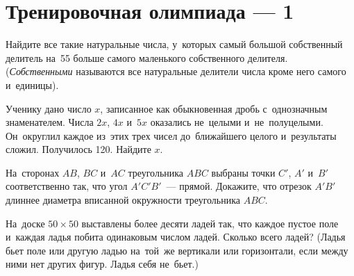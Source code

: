 
\section*{Тренировочная олимпиада --- 1}



\begin{problems}

\item
Найдите все такие натуральные числа, у~которых самый большой собственный
делитель на~55 больше самого маленького собственного делителя.
(\emph{Собственными} называются все натуральные делители числа кроме него самого
и~единицы).

\item
Ученику дано число $x$, записанное как обыкновенная дробь с~однозначным
знаменателем.
Числа $2 x$, $4 x$ и~$5 x$ оказались не~целыми и~не~полуцелыми.
Он~округлил каждое из~этих трех чисел до~ближайшего целого и~результаты сложил.
Получилось 120.
Найдите $x$.

\item
На~сторонах $AB$, $BC$ и~$AC$ треугольника $ABC$ выбраны
точки $C'$, $A'$ и~$B'$ соответственно так, что угол $A'C'B'$~--- прямой.
Докажите, что отрезок $A'B'$ длиннее диаметра вписанной окружности
треугольника $ABC$.

\item
На~доске $50 \times 50$ выставлены более десяти ладей так, что каждое пустое
поле и~каждая ладья побита одинаковым числом ладей.
Сколько всего ладей?
(Ладья бьет поле или другую ладью на~той~же вертикали или горизонтали, если
между ними нет других фигур.
Ладья себя не~бьет.)

\end{problems}

